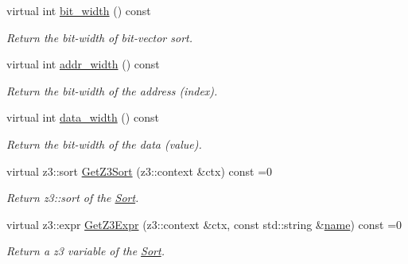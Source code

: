 \begin{DoxyCompactItemize}
\mbox{\label{classilang_1_1_sort_a8bfc1d2049279a2ad2be608e14731d1d}} 
virtual int \mbox{\hyperlink{classilang_1_1_sort_a8bfc1d2049279a2ad2be608e14731d1d}{bit\+\_\+width}} () const
\begin{DoxyCompactList}\small\item\em Return the bit-\/width of bit-\/vector sort. \end{DoxyCompactList}\item 
\mbox{\label{classilang_1_1_sort_a6f3a690a09c3f4aad3ff63daeede0715}} 
virtual int \mbox{\hyperlink{classilang_1_1_sort_a6f3a690a09c3f4aad3ff63daeede0715}{addr\+\_\+width}} () const
\begin{DoxyCompactList}\small\item\em Return the bit-\/width of the address (index). \end{DoxyCompactList}\item 
\mbox{\label{classilang_1_1_sort_a4c5f5d8cb6b9b16f68236b515e2f2567}} 
virtual int \mbox{\hyperlink{classilang_1_1_sort_a4c5f5d8cb6b9b16f68236b515e2f2567}{data\+\_\+width}} () const
\begin{DoxyCompactList}\small\item\em Return the bit-\/width of the data (value). \end{DoxyCompactList}\item 
\mbox{\label{classilang_1_1_sort_ab9ea013e2fe4c71757194b3d24184eb7}} 
virtual z3\+::sort \mbox{\hyperlink{classilang_1_1_sort_ab9ea013e2fe4c71757194b3d24184eb7}{Get\+Z3\+Sort}} (z3\+::context \&ctx) const =0
\begin{DoxyCompactList}\small\item\em Return z3\+::sort of the \mbox{\hyperlink{classilang_1_1_sort}{Sort}}. \end{DoxyCompactList}\item 
\mbox{\label{classilang_1_1_sort_a75aa2fc1da69fceaaf6c2fc0edcd9659}} 
virtual z3\+::expr \mbox{\hyperlink{classilang_1_1_sort_a75aa2fc1da69fceaaf6c2fc0edcd9659}{Get\+Z3\+Expr}} (z3\+::context \&ctx, const std\+::string \&\mbox{\hyperlink{classilang_1_1_object_acf20b072e69f572910d7d80c93af0b38}{name}}) const =0
\begin{DoxyCompactList}\small\item\em Return a z3 variable of the \mbox{\hyperlink{classilang_1_1_sort}{Sort}}. \end{DoxyCompactList}\item 

\end{DoxyCompactItemize}
